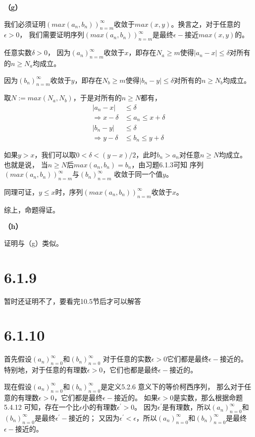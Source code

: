 \documentclass{article}
\theoremstyle{mystyle}
\begin{document}
\textbf{（g）}

我们必须证明$(max(a_n,b_n))_{n=m}^\infty$收敛于$max(x,y)$。换言之，对于任意的$\epsilon > 0$，
我们需要证明序列$(max(a_n,b_n))_{n=m}^\infty$是最终$\epsilon -$接近$max(x,y)$的。

任意实数$\delta > 0$，
因为$(a_n)_{n=m}^\infty$收敛于$x$，即存在$N_a \geq m$使得$|a_n - x| \leq \delta$对所有的$n \geq N_a$均成立。

因为$(b_n)_{n=m}^\infty$收敛于$y$，即存在$N_b \geq m$使得$|b_n - y| \leq \delta$对所有的$n \geq N_b$均成立。

取$N := max(N_a, N_b)$，于是对所有的$n \geq N$都有，
\begin{align*}
  |a_n - x|              & \leq \delta              \\
  \Rightarrow x - \delta & \leq a_n \leq x + \delta \\
  |b_n - y|              & \leq \delta              \\
  \Rightarrow y - \delta & \leq b_n \leq y + \delta
\end{align*}

如果$y > x$，我们可以取$0 < \delta < (y-x)/2$，此时$b_n > a_n$对任意$n \geq N$均成立。也就是说，
当$n \geq N$后$max(a_n,b_n) = b_n$，由习题6.1.3可知 序列$(max(a_n,b_n))_{n=m}^\infty$与$(b_n)_{n=m}^\infty$
收敛于同一个值$y$。

同理可证，$y \leq x$时，序列$(max(a_n,b_n))_{n=m}^\infty$收敛于$x$。

综上，命题得证。

\textbf{（h）}

证明与（g）类似。


\section*{6.1.9}

暂时还证明不了，要看完10.5节后才可以解答

\section*{6.1.10}

首先假设$(a_n)_{n=0}^\infty$和$(b_n)_{n=0}^\infty$
对于任意的实数$\epsilon > 0$它们都是最终$\epsilon -$接近的。
特别地，对于任意的有理数$\epsilon > 0$，它们也都是最终$\epsilon -$接近的。

现在假设$(a_n)_{n=0}^\infty$和$(b_n)_{n=0}^\infty$是定义5.2.6 意义下的等价柯西序列，
那么对于任意的有理数$\epsilon > 0$，它们都是最终$\epsilon -$接近的。
如果$\epsilon > 0$是实数，那么根据命题5.4.12 可知，存在一个比$\epsilon$小的有理数$\epsilon^\prime > 0$。
因为$\epsilon^\prime$是有理数，所以$(a_n)_{n=0}^\infty$和$(b_n)_{n=0}^\infty$是最终$\epsilon^\prime -$接近的；
又因为$\epsilon^\prime < \epsilon$，所以$(a_n)_{n=0}^\infty$和$(b_n)_{n=0}^\infty$是最终$\epsilon -$接近的。
\end{document}
